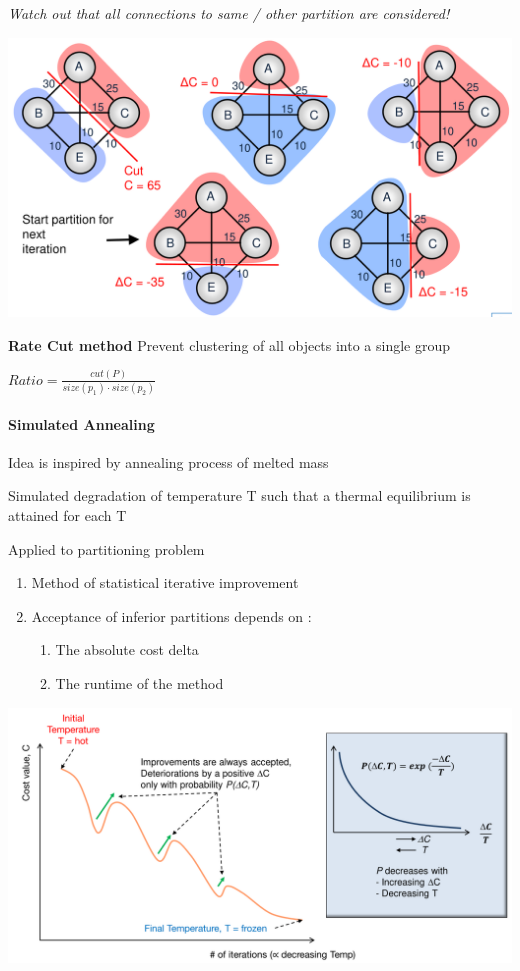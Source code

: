 \documentclass[english]{latex4ei/latex4ei_sheet}
\begin{document}
\textit{Watch out that all connections to same / other partition are considered!}

\begin{center}
  \includegraphics[width=0.8\linewidth]{assets/MinCut.png}
  \label{fig:mincut}
\end{center}

\textbf{Rate Cut method} Prevent clustering of all objects into a single group

$Ratio = \frac{cut(P)}{size(p_1) \cdot size(p_2)}$

\paragraph{Simulated Annealing}
Idea is inspired by annealing process of melted mass

Simulated degradation of temperature T such that a thermal equilibrium is attained for each T

Applied to partitioning problem
\begin{enumerate}
	\item  Method of statistical iterative improvement 
	\item Acceptance of inferior partitions depends on :
	  \begin{enumerate}
	  	\item The absolute cost delta
		\item The runtime of the method
	  \end{enumerate}
\end{enumerate}

\begin{center}
  \includegraphics[width=0.8\linewidth]{assets/SimulatedAnnealing.png}
  \label{fig:simulatedannealing}
\end{center}
\end{document}
